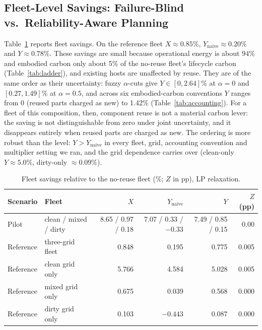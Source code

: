 \documentclass{article} %
\begin{document}
\subsection{Fleet-Level Savings: Failure-Blind vs.\ Reliability-Aware Planning}
\label{sec:fleet}
Table~\ref{tab:fleet_savings} reports fleet savings. On the reference fleet $X \approx 0.85\%$, $Y_{\text{naive}} \approx 0.20\%$ and $Y \approx 0.78\%$. These savings are small because operational energy is about 94\% and embodied carbon only about 5\% of the no-reuse fleet's lifecycle carbon (Table~\ref{tab:ladder}), and existing hosts are unaffected by reuse. They are of the same order as their uncertainty: fuzzy $\alpha$-cuts give $Y\in[0, 2.64]\%$ at $\alpha=0$ and $[0.27, 1.49]\%$ at $\alpha=0.5$, and across six embodied-carbon conventions $Y$ ranges from 0 (reused parts charged as new) to 1.42\% (Table~\ref{tab:accounting}). For a fleet of this composition, then, component reuse is not a material carbon lever: the saving is not distinguishable from zero under joint uncertainty, and it disappears entirely when reused parts are charged as new. The ordering is more robust than the level: $Y > Y_{\text{naive}}$ in every fleet, grid, accounting convention and multiplier setting we ran, and the grid dependence carries over (clean-only $Y \approx 5.0\%$, dirty-only $\approx 0.09\%$).

\begin{table}[t]
\caption{Fleet savings relative to the no-reuse fleet (\%; $Z$ in pp), LP relaxation.}
\label{tab:fleet_savings}
\begin{center}
\small
\begin{tabular}{llrrrr}
\toprule
Scenario & Fleet & $X$ & $Y_{\text{naive}}$ & $Y$ & $Z$ (pp) \\
\midrule
Pilot & clean / mixed / dirty & 8.65 / 0.97 / 0.18 & 7.07 / 0.33 / $-0.33$ & 7.49 / 0.85 / 0.15 & 0.00 \\
\midrule
Reference & three-grid fleet & 0.848 & 0.195 & 0.775 & 0.005 \\
Reference & clean grid only & 5.766 & 4.584 & 5.028 & 0.005 \\
Reference & mixed grid only & 0.675 & 0.039 & 0.568 & 0.000 \\
Reference & dirty grid only & 0.103 & $-0.443$ & 0.087 & 0.000 \\
\bottomrule
\end{tabular}
\end{center}
\end{table}
\end{document}
